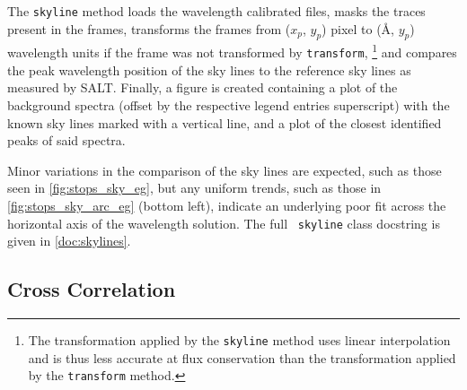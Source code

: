 The \texttt{skyline} method loads the wavelength calibrated files, masks the traces present in the frames, transforms the frames from ($x_p$, $y_p$) pixel to (\AA, $y_p$) wavelength units if the frame was not transformed by \texttt{transform},%
\footnote{The transformation applied by the \texttt{skyline} method uses linear interpolation and is thus less accurate at flux conservation than the transformation applied by the \texttt{transform} method.}
and compares the peak wavelength position of the sky lines to the reference sky lines as measured by \gls{SALT}. Finally, a figure is created containing a plot of the background spectra (offset by the respective legend entries superscript) with the known sky lines marked with a vertical line, and a plot of the closest identified peaks of said spectra.

Minor variations in the comparison of the sky lines are expected, such as those seen in \autoref{fig:stops_sky_eg}, but any uniform trends, such as those in \autoref{fig:stops_sky_arc_eg} (bottom left), indicate an underlying poor fit across the horizontal axis of the wavelength solution.
% 
The full \stops\ \texttt{skyline} class docstring is given in \autoref{doc:skylines}.

\subsection{Cross Correlation} \label{subsec:stops_correlate}

